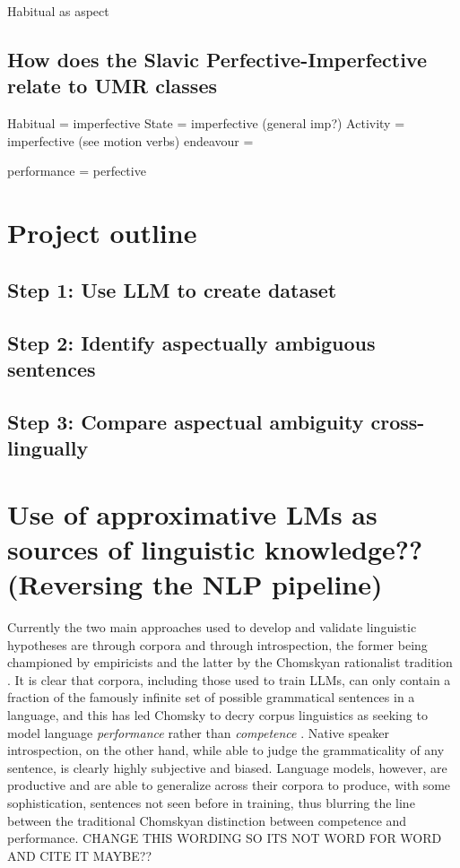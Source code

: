 Habitual as aspect

\subsection{How does the Slavic Perfective-Imperfective relate to UMR classes}

Habitual = imperfective
State = imperfective (general imp?)
Activity = imperfective (see motion verbs)
endeavour = 

performance = perfective

\section{Project outline}
\subsection{Step 1: Use LLM to create dataset}
\subsection{Step 2: Identify aspectually ambiguous sentences}
\subsection{Step 3: Compare aspectual ambiguity cross-lingually}

\section{Use of approximative LMs as sources of linguistic knowledge?? (Reversing the NLP pipeline)}
Currently the two main approaches used to develop and validate linguistic hypotheses are through corpora and through introspection, the former being championed by empiricists and the latter by the Chomskyan rationalist tradition \citep{corpus_textbook}. It is clear that corpora, including those used to train LLMs, can only contain a fraction of the famously infinite set of possible grammatical sentences in a language, and this has led Chomsky to decry corpus linguistics as seeking to model language \emph{performance} rather than \emph{competence} \citep{corpus_textbook}. Native speaker introspection, on the other hand, while able to judge the grammaticality of any sentence, is clearly highly subjective and biased. Language models, however, are productive and are able to generalize across their corpora to produce, with some sophistication, sentences not seen before in training, thus blurring the line between the traditional Chomskyan distinction between competence and performance. CHANGE THIS WORDING SO ITS NOT WORD FOR WORD AND CITE IT MAYBE??
